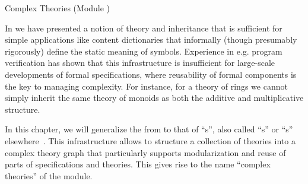 
\begin{tchapter}[id=complex-theories,short=Complex Theories]{Complex Theories (Module
    )}

  In  we have presented a notion of theory and inheritance that is
  sufficient for simple applications like content dictionaries that informally (though
  presumably rigorously) define the static meaning of symbols. Experience in e.g. program
  verification has shown that this infrastructure is insufficient for large-scale
  developments of formal specifications, where reusability of formal components is the key
  to managing complexity. For instance, for a theory of rings we cannot simply inherit the
  same theory of monoids as both the additive and multiplicative structure.

  In this chapter, we will generalize the  from
   to that of ``s'', also called
  ``s'' or ``s''
  elsewhere~\cite{Farmer93}.  This infrastructure allows to structure a collection of
  theories into a complex theory graph that particularly supports modularization and reuse
  of parts of specifications and theories. This gives rise to the name ``complex
  theories'' of the \omdoc module.


\end{tchapter}

